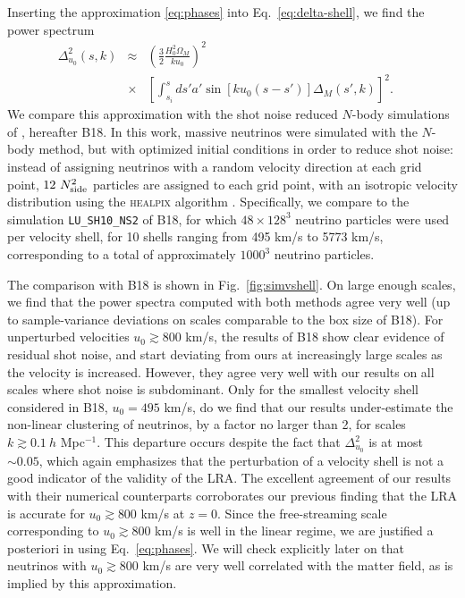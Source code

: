 \documentclass[useAMS, usenatbib]{mnras}
\newcommand{\barr}{\begin{eqnarray}}
\newcommand{\earr}{\end{eqnarray}}
\newcommand{\spb}[1]{{\textcolor{green}{[{\bf SPB}: #1]}}}
\begin{document}
Inserting the approximation \eqref{eq:phases} into Eq.~\eqref{eq:delta-shell}, we find the power spectrum
\barr
\Delta^2_{u_0}(s, k)&\approx& \left(\frac32 \frac{H_0^2 \Omega_M}{k u_0}\right)^2\nonumber\\
&\times& \left[\int_{s_i}^s ds' a' \sin[k u_0 (s - s')] \Delta_M(s', k) \right]^2. ~~~~~
\earr
We compare this approximation with the shot noise reduced $N$-body simulations of \cite{Banerjee_2018}, hereafter B18. In this work, massive neutrinos were simulated with the $N$-body method, but with optimized initial conditions in order to reduce shot noise: instead of assigning neutrinos with a random velocity direction at each grid point, $12 ~N_{\rm side}^2$ particles are assigned to each grid point, with an isotropic velocity distribution using the \textsc{healpix} algorithm \citep{Healpix}. Specifically, we compare to the simulation \texttt{LU\_SH10\_NS2} of B18, for which $48 \times 128^3$ neutrino particles were used per velocity shell, for 10 shells ranging from 495 km/s to 5773 km/s, corresponding to a total of approximately $1000^3$ neutrino particles.

The comparison with B18 is shown in Fig.~\ref{fig:simvshell}. On large enough scales, we find that the power spectra computed with both methods agree very well (up to sample-variance deviations on scales comparable to the box size of B18). For unperturbed velocities $u_0 \gtrsim 800$ km/s, the results of B18 show clear evidence of residual shot noise, and start deviating from ours at increasingly large scales as the velocity is increased. However, they agree very well with our results on all scales where shot noise is subdominant. Only for the smallest velocity shell considered in B18, $u_0 = 495$ km/s, do we find that our results under-estimate the non-linear clustering of neutrinos, by a factor no larger than 2, for scales $k \gtrsim 0.1~h$ Mpc$^{-1}$. This departure occurs despite the fact that $\Delta^2_{u_0}$ is at most $\sim 0.05$, which again emphasizes that the perturbation of a velocity shell is not a good indicator of the validity of the LRA.
The excellent agreement of our results with their numerical counterparts corroborates our previous finding that the LRA is accurate for $u_0 \gtrsim 800$ km/s at $z = 0$. Since the free-streaming scale corresponding to $u_0 \gtrsim 800$ km/s is well in the linear regime, we are justified a posteriori in using Eq.~\eqref{eq:phases}. We will check explicitly later on that neutrinos with $u_0 \gtrsim 800$ km/s are very well correlated with the matter field, as is implied by this approximation.
\end{document}
